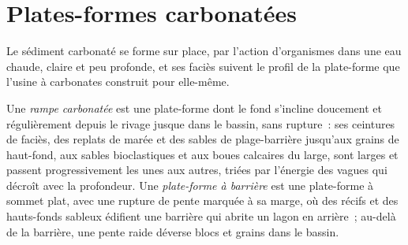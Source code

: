 \begin{omfigure}
\par{}\label{fig:b3:facies-models:deep}
\end{omfigure}

\section{Plates-formes carbonatées}\label{sec:b3:facies-models:carbonates}

Le sédiment carbonaté se forme sur place, par l'action d'organismes dans une eau chaude, claire
et peu profonde, et ses faciès suivent le profil de la plate-forme que
l'usine à carbonates construit pour elle-même.

\begin{definition}\label{def:b3:facies-models:ramp}
Une \emph{rampe carbonatée} est une plate-forme dont le fond
s'incline doucement et régulièrement depuis le rivage jusque dans le bassin, sans rupture~:
ses ceintures de faciès, des replats de marée et des sables de plage-barrière jusqu'aux grains de haut-fond,
aux sables bioclastiques et aux boues calcaires du large, sont larges et passent
progressivement les unes aux autres, triées par l'énergie des vagues qui décroît avec la profondeur. Une \emph{plate-forme
à barrière} est une plate-forme à sommet plat, avec une rupture de pente marquée
à sa marge, où des récifs et des hauts-fonds sableux édifient une barrière qui abrite
un lagon en arrière~; au-delà de la barrière, une pente raide déverse blocs et grains dans le
bassin.
\end{definition}


